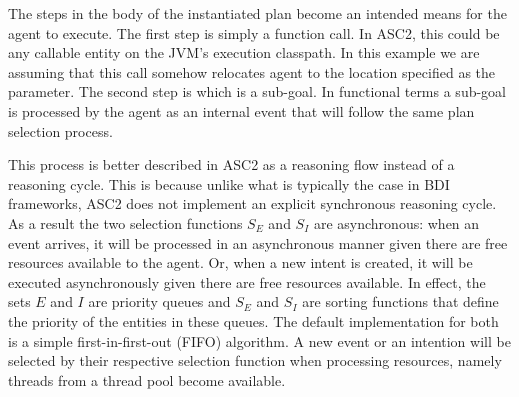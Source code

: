 The steps in the body of the instantiated plan become an intended means for the agent to execute. The first step  is simply a function call. In ASC2, this could be any callable entity on the JVM's execution classpath. In this example we are assuming that this call somehow relocates agent to the location specified as the parameter. The second step is  which is a sub-goal. In functional terms a sub-goal is processed by the agent as an internal event that will follow the same plan selection process.

This process is better described in ASC2 as a reasoning flow instead of a reasoning cycle. This is because unlike what is typically the case in BDI frameworks, ASC2 does not implement an explicit synchronous reasoning cycle. As a result the two selection functions $S_E$ and $S_I$ are asynchronous: when an event arrives, it will be processed in an asynchronous manner given there are free resources available to the agent. Or, when a new intent is created, it will be executed asynchronously given there are free resources available. In effect, the sets $E$ and $I$ are priority queues and $S_E$ and $S_I$ are sorting functions that define the priority of the entities in these queues. The default implementation for both is a simple first-in-first-out (FIFO) algorithm. A new event or an intention will be selected by their respective selection function when processing resources, namely threads from a thread pool become available.











